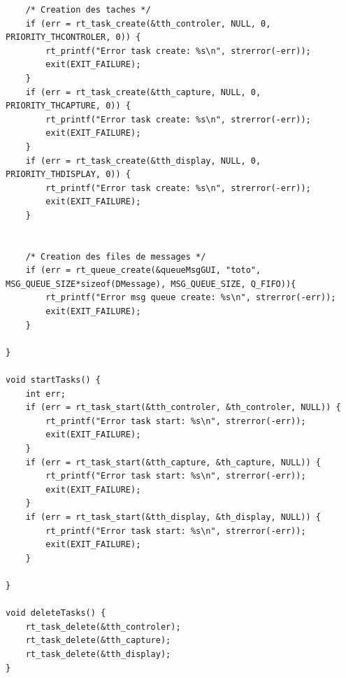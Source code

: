 \documentclass[11pt, a4paper]{paper}
\begin{document}
\begin{itemize}
\begin{lstlisting}
    /* Creation des taches */
    if (err = rt_task_create(&tth_controler, NULL, 0, PRIORITY_THCONTROLER, 0)) {
        rt_printf("Error task create: %s\n", strerror(-err));
        exit(EXIT_FAILURE);
    }
    if (err = rt_task_create(&tth_capture, NULL, 0, PRIORITY_THCAPTURE, 0)) {
        rt_printf("Error task create: %s\n", strerror(-err));
        exit(EXIT_FAILURE);
    }
    if (err = rt_task_create(&tth_display, NULL, 0, PRIORITY_THDISPLAY, 0)) {
        rt_printf("Error task create: %s\n", strerror(-err));
        exit(EXIT_FAILURE);
    }


    /* Creation des files de messages */
    if (err = rt_queue_create(&queueMsgGUI, "toto", MSG_QUEUE_SIZE*sizeof(DMessage), MSG_QUEUE_SIZE, Q_FIFO)){
        rt_printf("Error msg queue create: %s\n", strerror(-err));
        exit(EXIT_FAILURE);
    }

}

void startTasks() {
    int err;
    if (err = rt_task_start(&tth_controler, &th_controler, NULL)) {
        rt_printf("Error task start: %s\n", strerror(-err));
        exit(EXIT_FAILURE);
    }
    if (err = rt_task_start(&tth_capture, &th_capture, NULL)) {
        rt_printf("Error task start: %s\n", strerror(-err));
        exit(EXIT_FAILURE);
    }
    if (err = rt_task_start(&tth_display, &th_display, NULL)) {
        rt_printf("Error task start: %s\n", strerror(-err));
        exit(EXIT_FAILURE);
    }

}

void deleteTasks() {
    rt_task_delete(&tth_controler);
    rt_task_delete(&tth_capture);
    rt_task_delete(&tth_display);
}
\end{lstlisting}
\end{itemize}
\end{document}
